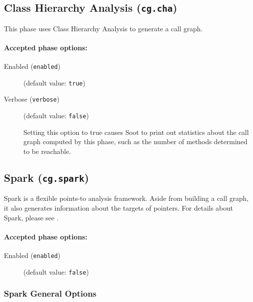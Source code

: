 \documentclass{article}
\begin{document}
\subsection{Class Hierarchy Analysis ({\tt cg.cha})}
This phase uses Class Hierarchy Analysis to generate a call graph.

\paragraph{Accepted phase options:} 

\begin{description}

\item[Enabled ({\tt enabled})]
(default value: {\tt true})






\item[Verbose ({\tt verbose})]
(default value: {\tt false})



Setting this option to true causes Soot to print out statistics about the call graph computed by this phase, such as the number of methods determined to be reachable.


\end{description}

\subsection{Spark ({\tt cg.spark})}
Spark is a flexible points-to analysis framework. Aside from building a call graph, it also generates information about the targets of pointers. For details about Spark, please see .

\paragraph{Accepted phase options:} 

\begin{description}

\item[Enabled ({\tt enabled})]
(default value: {\tt false})






\end{description}

\subsubsection{Spark General Options}
\end{document}
